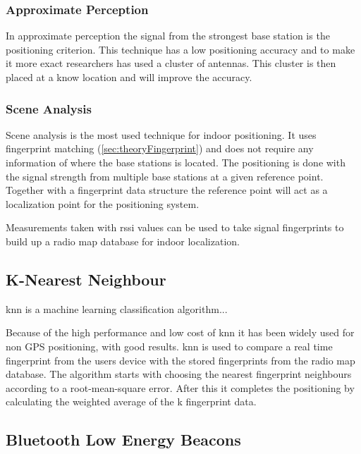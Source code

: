\subsubsection{Approximate Perception}\label{sec:theoryRssiApproxPerception}
In approximate perception the signal from the strongest base station is the positioning criterion.
This technique has a low positioning accuracy and to make it more exact researchers has used a cluster of antennas.
This cluster is then placed at a know location and will improve the accuracy.\cite{IndoorFingerprintPositioning2017} 

\subsubsection{Scene Analysis}\label{sec:theoryRssiSceneAnalysis}
Scene analysis is the most used technique for indoor positioning.
It uses fingerprint matching (\cref{sec:theoryFingerprint}) and does not require any information of where the base stations is located.
The positioning is done with the signal strength from multiple base stations at a given reference point.
Together with a fingerprint data structure the reference point will act as a localization point for the positioning system.\cite{IndoorFingerprintPositioning2017} 

\bigskip

Measurements taken with \acrshort{rssi} values can be used to take signal fingerprints to build up a radio map database for indoor localization.\cite{DevelopmentMobileIndoor2017} 



\subsection{K-Nearest Neighbour}\label{sec:theoryKnn}
\acrfull{knn} is a machine learning classification algorithm...

\bigskip

Because of the high performance and low cost of \acrshort{knn} it has been widely used for non GPS positioning, with good results.
\acrshort{knn} is used to compare a real time fingerprint from the users device with the stored fingerprints from the radio map database.
The algorithm starts with choosing the nearest fingerprint neighbours according to a root-mean-square error.
After this it completes the positioning by calculating the weighted average of the k fingerprint data.
\cite{IndoorFingerprintPositioning2017}  

\subsection{Bluetooth Low Energy Beacons}\label{sec:theoryBleBeacons}

